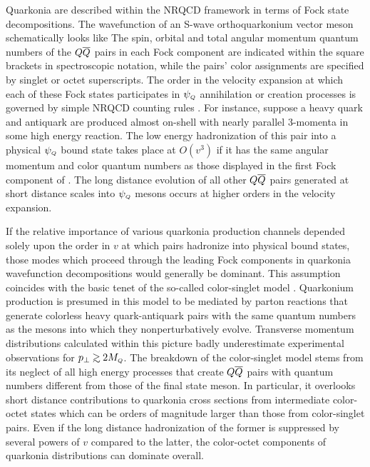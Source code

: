 	Quarkonia are described within the NRQCD framework in terms of 
Fock state decompositions.  The wavefunction of an S-wave orthoquarkonium 
vector meson schematically looks like
%
\eqn{}
%
The spin, orbital and total angular momentum quantum numbers of the $Q{\overline Q}$ 
pairs in each Fock component are indicated within the square brackets in 
spectroscopic notation, while the pairs' color assignments are specified
by singlet or octet superscripts.  The order in the velocity expansion 
at which each of these Fock states participates in $\psi_{\scriptscriptstyle Q}$ annihilation or 
creation processes is governed by simple NRQCD counting rules \Lepage.
For instance, suppose a heavy quark and antiquark are produced almost 
on-shell with nearly parallel 3-momenta in some high energy reaction.  The 
low energy hadronization of this pair into a physical $\psi_{\scriptscriptstyle Q}$ bound 
state takes place at $O(v^3)$ if it has the same angular momentum and color 
quantum numbers as those displayed in the first Fock component of 
\psiwavefunc.  The long distance evolution of all other $Q{\overline Q}$ pairs 
generated at short distance scales into $\psi_{\scriptscriptstyle Q}$ mesons occurs at higher orders 
in the velocity expansion.  

	If the relative importance of various quarkonia production channels 
depended solely upon the order in $v$ at which pairs hadronize into physical 
bound states, those modes which proceed through the leading Fock components in 
quarkonia wavefunction decompositions would generally be dominant.  This 
assumption coincides with the basic tenet of the so-called color-singlet model 
.  Quarkonium production is presumed in this model to 
be mediated by parton reactions that generate colorless heavy quark-antiquark 
pairs with the same quantum numbers as the mesons into which they 
nonperturbatively evolve.  Transverse momentum distributions calculated within 
this picture badly underestimate experimental observations for $\pT \gtap 
2 \MQ$.  The breakdown of the color-singlet model stems from its neglect of 
all high energy processes that create $Q{\overline Q}$ pairs with quantum numbers 
different from those of the final state meson.  In particular, it overlooks 
short distance contributions to quarkonia cross sections from intermediate 
color-octet states which can be orders of magnitude larger than those from 
color-singlet pairs.  Even if the long distance hadronization of the former is 
suppressed by several powers of $v$ compared to the latter, the color-octet 
components of quarkonia distributions can dominate overall. 


